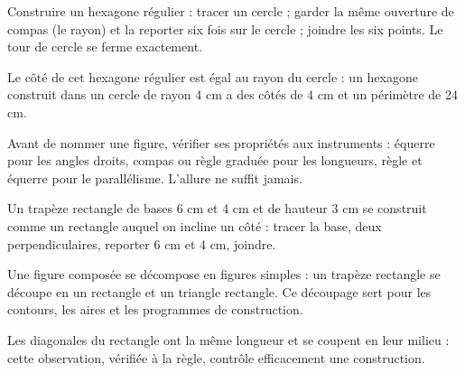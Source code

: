 \begin{savoirfaire}Construire un hexagone régulier : tracer un cercle ; garder la même ouverture de compas (le rayon) et la reporter six fois sur le cercle ; joindre les six points. Le tour de cercle se ferme exactement.\end{savoirfaire}
\begin{exemple}Le côté de cet hexagone régulier est égal au rayon du cercle : un hexagone construit dans un cercle de rayon 4 cm a des côtés de 4 cm et un périmètre de 24 cm.\end{exemple}
\clearpage
{}\label{cours-16-4}
\begin{savoirfaire}Avant de nommer une figure, vérifier ses propriétés aux instruments : équerre pour les angles droits, compas ou règle graduée pour les longueurs, règle et équerre pour le parallélisme. L’allure ne suffit jamais.\end{savoirfaire}
\begin{exemple}Un trapèze rectangle de bases 6 cm et 4 cm et de hauteur 3 cm se construit comme un rectangle auquel on incline un côté : tracer la base, deux perpendiculaires, reporter 6 cm et 4 cm, joindre.\end{exemple}
\begin{propriete}Une figure composée se décompose en figures simples : un trapèze rectangle se découpe en un rectangle et un triangle rectangle. Ce découpage sert pour les contours, les aires et les programmes de construction.\end{propriete}
\begin{attention}Les diagonales du rectangle ont la même longueur et se coupent en leur milieu : cette observation, vérifiée à la règle, contrôle efficacement une construction.\end{attention}

